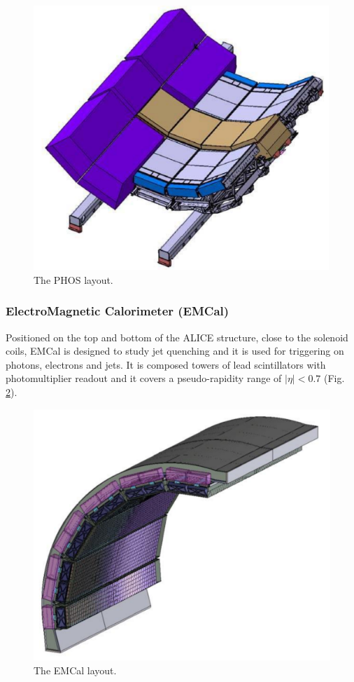 \begin{figure}[!h]
\begin{center}
\includegraphics[width=0.5\linewidth]{Chapters/Introduction/Figs/phos.pdf}
\caption{The PHOS layout.}
\label{fig:PHOS}
\end{center}
\end{figure}

\subsubsection{ElectroMagnetic Calorimeter (EMCal)}
Positioned on the top and bottom of the ALICE structure, close to the solenoid coils, EMCal is designed to study jet quenching and it is used for triggering on photons, electrons and jets.
It is composed towers of lead scintillators with photomultiplier readout and it covers a pseudo-rapidity range of $|\eta| < 0.7$ (Fig. \ref{fig:EMCAL}).

\begin{figure}[!h]
\begin{center}
\includegraphics[width=0.5\linewidth]{Chapters/Introduction/Figs/emcal.pdf}
\caption{The EMCal layout.}
\label{fig:EMCAL}
\end{center}
\end{figure}

